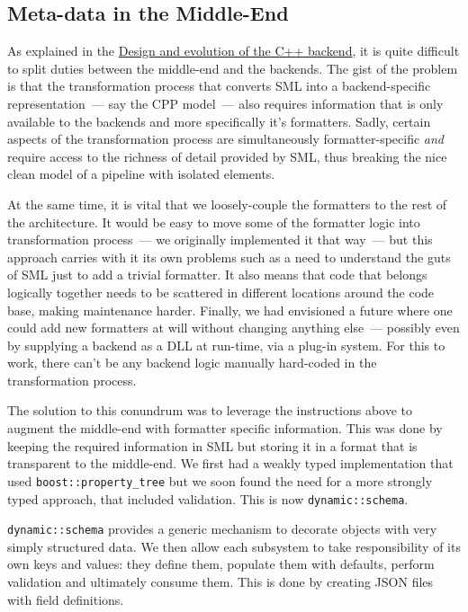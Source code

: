 \documentclass{book}
\begin{document}
\subsection{Meta-data in the Middle-End}

As explained in the
\href{https://github.com/DomainDrivenConsulting/dogen/blob/master/doc/manual/manual.org#design-and-evolution-of-the-c-backend}{Design
  and evolution of the C++ backend}, it is quite difficult to split
duties between the middle-end and the backends. The gist of the
problem is that the transformation process that converts SML into a
backend-specific representation~--- say the CPP model~--- also
requires information that is only available to the backends and more
specifically it's formatters. Sadly, certain aspects of the
transformation process are simultaneously formatter-specific
\emph{and} require access to the richness of detail provided by SML,
thus breaking the nice clean model of a pipeline with isolated
elements.

At the same time, it is vital that we loosely-couple the formatters to
the rest of the architecture. It would be easy to move some of the
formatter logic into transformation process~--- we originally
implemented it that way~--- but this approach carries with it its own
problems such as a need to understand the guts of SML just to add a
trivial formatter. It also means that code that belongs logically
together needs to be scattered in different locations around the code
base, making maintenance harder. Finally, we had envisioned a future
where one could add new formatters at will without changing anything
else~--- possibly even by supplying a backend as a DLL at run-time,
via a plug-in system. For this to work, there can't be any backend
logic manually hard-coded in the transformation process.

The solution to this conundrum was to leverage the instructions above
to augment the middle-end with formatter specific information. This
was done by keeping the required information in SML but storing it in
a format that is transparent to the middle-end. We first had a weakly
typed implementation that used \texttt{boost::property\_tree} but we
soon found the need for a more strongly typed approach, that included
validation. This is now \texttt{dynamic::schema}.

\texttt{dynamic::schema} provides a generic mechanism to decorate
objects with very simply structured data. We then allow each subsystem
to take responsibility of its own keys and values: they define them,
populate them with defaults, perform validation and ultimately consume
them. This is done by creating JSON files with field definitions.
\end{document}
